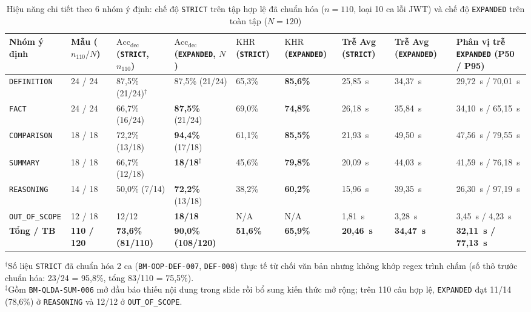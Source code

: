\documentclass{IEEEtran}
\begin{document}
\begin{table}[t]
\caption{Hiệu năng chi tiết theo 6 nhóm ý định: chế độ \texttt{STRICT} trên tập hợp lệ đã chuẩn hóa ($n=110$, loại 10 ca lỗi JWT) và chế độ \texttt{EXPANDED} trên toàn tập ($N=120$)}
\label{tab:intent_breakdown}
\centering
\scriptsize
\setlength{\tabcolsep}{3.0pt}
\begin{tabularx}{\textwidth}{|L{2.25cm}|C{0.95cm}|C{1.85cm}|C{1.75cm}|C{1.45cm}|C{1.45cm}|C{1.35cm}|C{1.35cm}|Y|}
\hline
\textbf{Nhóm ý định} & \textbf{Mẫu ($n_{110}/N$)} & \textbf{$\text{Acc}_{\text{dec}}$ (\texttt{STRICT}, $n_{110}$)} & \textbf{$\text{Acc}_{\text{dec}}$ (\texttt{EXPANDED}, $N$)} & \textbf{$\text{KHR}$ (\texttt{STRICT})} & \textbf{$\text{KHR}$ (\texttt{EXPANDED})} & \textbf{Trễ Avg (\texttt{STRICT})} & \textbf{Trễ Avg (\texttt{EXPANDED})} & \textbf{Phân vị trễ \texttt{EXPANDED} (P50 / P95)} \\
\hline
\texttt{DEFINITION} & 24 / 24 & 87,5\% (21/24)$^{\dagger}$ & 87,5\% (21/24) & 65,3\% & \textbf{85,6\%} & 25,85~s & 34,37~s & 29,72~s / 70,01~s \\
\texttt{FACT} & 24 / 24 & 66,7\% (16/24) & \textbf{87,5\%} (21/24) & 69,0\% & \textbf{74,8\%} & 26,18~s & 35,84~s & 34,10~s / 65,15~s \\
\texttt{COMPARISON} & 18 / 18 & 72,2\% (13/18) & \textbf{94,4\%} (17/18) & 61,1\% & \textbf{85,5\%} & 21,93~s & 49,50~s & 47,56~s / 79,55~s \\
\texttt{SUMMARY} & 18 / 18 & 66,7\% (12/18) & \textbf{18/18}$^{\ddagger}$ & 45,6\% & \textbf{79,8\%} & 20,09~s & 44,03~s & 41,59~s / 76,18~s \\
\texttt{REASONING} & 14 / 18 & 50,0\% (7/14) & \textbf{72,2\%} (13/18) & 38,2\% & \textbf{60,2\%} & 15,96~s & 39,35~s & 26,30~s / 97,19~s \\
\texttt{OUT\_OF\_SCOPE} & 12 / 18 & 12/12 & \textbf{18/18} & N/A & N/A & 1,81~s & 3,28~s & 3,45~s / 4,23~s \\
\hline
\textbf{Tổng / TB} & \textbf{110 / 120} & \textbf{73,6\% (81/110)} & \textbf{90,0\% (108/120)} & \textbf{51,6\%} & \textbf{65,9\%} & \textbf{20,46~s} & \textbf{34,47~s} & \textbf{32,11~s / 77,13~s} \\
\hline
\end{tabularx}
\vspace{2pt}
\begin{minipage}{\textwidth}
\scriptsize
$^{\dagger}$Số liệu \texttt{STRICT} đã chuẩn hóa 2 ca (\texttt{BM-OOP-DEF-007}, \texttt{DEF-008}) thực tế từ chối văn bản nhưng không khớp regex trình chấm (số thô trước chuẩn hóa: 23/24 = 95,8\%, tổng 83/110 = 75,5\%).\\
$^{\ddagger}$Gồm \texttt{BM-QLDA-SUM-006} mở đầu báo thiếu nội dung trong slide rồi bổ sung kiến thức mở rộng; trên 110 câu hợp lệ, \texttt{EXPANDED} đạt 11/14 (78,6\%) ở \texttt{REASONING} và 12/12 ở \texttt{OUT\_OF\_SCOPE}.
\end{minipage}
\end{table}
\end{document}
